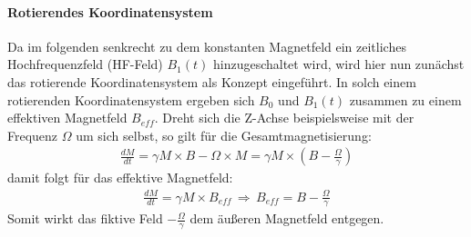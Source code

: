 \paragraph{Rotierendes Koordinatensystem}
Da im folgenden senkrecht zu dem konstanten Magnetfeld ein zeitliches Hochfrequenzfeld (HF-Feld) $B_1(t)$ hinzugeschaltet wird, wird hier nun zun\"{a}chst das rotierende Koordinatensystem als Konzept eingef\"{u}hrt.
In solch einem rotierenden Koordinatensystem ergeben sich $B_0$ und $B_1(t)$ zusammen zu einem effektiven Magnetfeld $B_{eff}$.
Dreht sich die Z-Achse beispielsweise mit der Frequenz $\Omega$ um sich selbst, so gilt f\"{u}r die Gesamtmagnetisierung:
\begin{align}
	\frac{dM}{dt} = \gamma M \times B - \Omega \times M = \gamma M \times \left(B - \frac{\Omega}{\gamma} \right)
\end{align}
damit folgt f\"{u}r das effektive Magnetfeld:
\begin{align}
	\frac{dM}{dt} = \gamma M \times B_{eff} \, \Rightarrow \, B_{eff} = B - \frac{\Omega}{\gamma}
\end{align}
Somit wirkt das fiktive Feld $- \frac{\Omega}{\gamma}$ dem \"{a}u{\ss}eren Magnetfeld entgegen.

